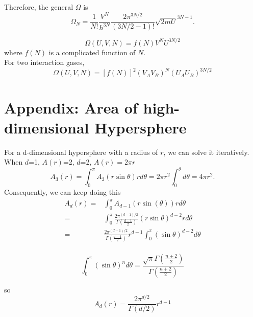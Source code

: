 Therefore, the general $\Omega$ is
\begin{equation} 
\Omega_N = \frac{1}{N!} \frac{V^N}{h^{3N}} \frac{2\pi^{3N/2}}{(3N/2-1)!} \sqrt{2mU}^{3N-1}. 
\end{equation}


\begin{equation}
\Omega(U,V,N) = f(N)V^NU^{3N/2}
\end{equation}
where $f(N)$ is a complicated function of $N$.\\

For two interaction gases,
\begin{equation}
\Omega(U,V,N) = [f(N)]^2(V_AV_B)^N(U_AU_B)^{3N/2}
\end{equation}


\section{Appendix: Area of high-dimensional Hypersphere}
For a d-dimensional hypersphere with a radius of $r$, we can solve it iteratively.
When $d$=1, $A(r)$=2, $d$=2, $A(r)=2\pi r$
\begin{equation}
    A_3(r) = \int_0^{\pi} A_2(r\sin\theta)rd\theta = 2\pi r^2 \int_0^{\theta}d\theta = 4\pi r^2.
\end{equation}
Consequently, we can keep doing this
\begin{equation}
\begin{split}
    A_d(r) = & \int_0^\pi{A_{d-1}(r\sin(\theta))rd\theta} \\
           = & \int_0^\pi\frac{2\pi^{(d-1)/2}}{\Gamma(\frac{d-1}{2})}(r\sin\theta)^{d-2}rd\theta \\
           = & \frac{2\pi^{(d-1)/2}}{\Gamma(\frac{d-1}{2})}r^{d-1} \int_0^{\pi}(\sin\theta)^{d-2}d\theta\\
\end{split}
\end{equation}

\begin{equation}
    \int_0^{\pi} (\sin\theta)^nd\theta = \frac{\sqrt{\pi}\Gamma(\frac{n+2}{2})}{\Gamma(\frac{n+2}{2})}
\end{equation}

so
\begin{equation}
    A_d(r) = \frac{2\pi^{d/2}}{\Gamma(d/2)}r^{d-1}
\end{equation}

